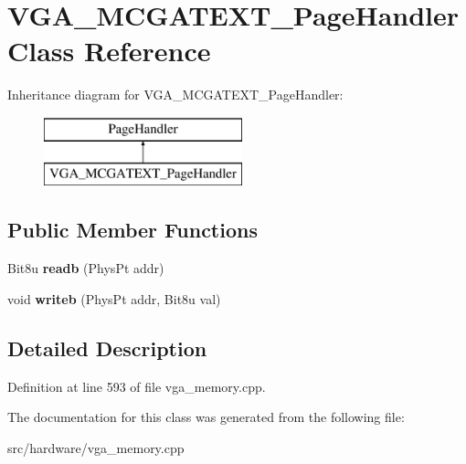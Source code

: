 \hypertarget{classVGA__MCGATEXT__PageHandler}{\section{V\-G\-A\-\_\-\-M\-C\-G\-A\-T\-E\-X\-T\-\_\-\-Page\-Handler Class Reference}
\label{classVGA__MCGATEXT__PageHandler}
}
Inheritance diagram for V\-G\-A\-\_\-\-M\-C\-G\-A\-T\-E\-X\-T\-\_\-\-Page\-Handler\-:\begin{figure}[H]
\begin{center}
\leavevmode
\includegraphics[height=2.000000cm]{classVGA__MCGATEXT__PageHandler}
\end{center}
\end{figure}
\subsection*{Public Member Functions}
\begin{DoxyCompactItemize}
\item 
\hypertarget{classVGA__MCGATEXT__PageHandler_af89d10f79b96e8172aa46a273bad0407}{Bit8u {\bfseries readb} (Phys\-Pt addr)}\label{classVGA__MCGATEXT__PageHandler_af89d10f79b96e8172aa46a273bad0407}

\item 
\hypertarget{classVGA__MCGATEXT__PageHandler_a16752b37caf2a5687dd70f7d92533b55}{void {\bfseries writeb} (Phys\-Pt addr, Bit8u val)}\label{classVGA__MCGATEXT__PageHandler_a16752b37caf2a5687dd70f7d92533b55}

\end{DoxyCompactItemize}


\subsection{Detailed Description}


Definition at line 593 of file vga\-\_\-memory.\-cpp.



The documentation for this class was generated from the following file\-:\begin{DoxyCompactItemize}
\item 
src/hardware/vga\-\_\-memory.\-cpp\end{DoxyCompactItemize}
